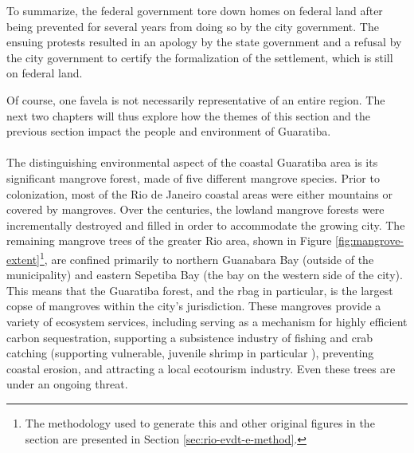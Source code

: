 To summarize, the federal government tore down homes on federal land after being prevented for several years from doing so by the city government. The ensuing protests resulted in an apology by the state government and a refusal by the city government to certify the formalization of the settlement, which is still on federal land.

Of course, one favela is not necessarily representative of an entire region. The next two chapters will thus explore how the themes of this section and the previous section impact the people and environment of Guaratiba.

\paragraph{} \leavevmode\newline \label{sec:guaratiba-environment}

The distinguishing environmental aspect of the coastal Guaratiba area is its significant mangrove forest, made of five different mangrove species. Prior to colonization, most of the Rio de Janeiro coastal areas were either mountains or covered by mangroves. Over the centuries, the lowland mangrove forests were incrementally destroyed and filled in order to accommodate the growing city. The remaining mangrove trees of the greater Rio area, shown in Figure \ref{fig:mangrove-extent}\footnote{The methodology used to generate this and other original figures in the section are presented in Section \ref{sec:rio-evdt-e-method}.}, are confined primarily to northern Guanabara Bay (outside of the municipality) and eastern Sepetiba Bay (the bay on the western side of the city). This means that the Guaratiba forest, and the \ac{rbag} in particular, is the largest copse of mangroves within the city’s jurisdiction. These mangroves provide a variety of ecosystem services, including serving as a mechanism for highly efficient carbon sequestration, supporting a subsistence industry of fishing and crab catching (supporting vulnerable, juvenile shrimp in particular \cite{costaPensarMarPara1992}), preventing coastal erosion, and attracting a local ecotourism industry. Even these trees are under an ongoing threat.

